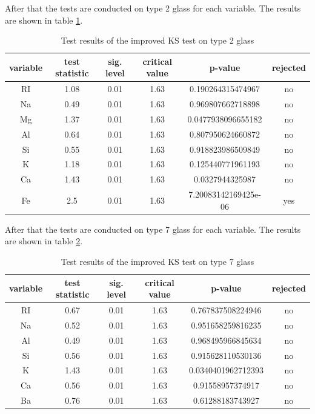 \documentclass[a4paper, 12pt, titlepage, headsepline, listof = totoc, bibliography = totoc, numbers = noenddot]{scrartcl}
\begin{document}
After that the tests are conducted on type 2 glass for each variable.
The results are shown in table \ref{tab:KS-type2}.

\begin{table}[h!]
\centering
\begin{tabular}{|cccccc|} \hline variable & test statistic & sig. level & critical value & p-value & rejected\\ \hline RI & 1.08 & 0.01 & 1.63 & 0.190264315474967 & no\\ 
Na & 0.49 & 0.01 & 1.63 & 0.969807662718898 & no\\ 
Mg & 1.37 & 0.01 & 1.63 & 0.0477938096655182 & no\\ 
Al & 0.64 & 0.01 & 1.63 & 0.807950624660872 & no\\ 
Si & 0.55 & 0.01 & 1.63 & 0.918823986509849 & no\\ 
K & 1.18 & 0.01 & 1.63 & 0.125440771961193 & no\\ 
Ca & 1.43 & 0.01 & 1.63 & 0.0327944325987 & no\\ 
Fe & 2.5 & 0.01 & 1.63 & 7.20083142169425e-06 & yes\\ \hline \end{tabular}\caption{Test results of the improved KS test on type 2 glass}
\label{tab:KS-type2}
\end{table}

After that the tests are conducted on type 7 glass for each variable.
The results are shown in table \ref{tab:KS-type7}.

\begin{table}[h!]
\centering
\begin{tabular}{|cccccc|} \hline variable & test statistic & sig. level & critical value & p-value & rejected\\ \hline RI & 0.67 & 0.01 & 1.63 & 0.767837508224946 & no\\ 
Na & 0.52 & 0.01 & 1.63 & 0.951658259816235 & no\\ 
Al & 0.49 & 0.01 & 1.63 & 0.968495966845634 & no\\ 
Si & 0.56 & 0.01 & 1.63 & 0.915628110530136 & no\\ 
K & 1.43 & 0.01 & 1.63 & 0.0340401962712393 & no\\ 
Ca & 0.56 & 0.01 & 1.63 & 0.91558957374917 & no\\ 
Ba & 0.76 & 0.01 & 1.63 & 0.61288183743927 & no\\ \hline \end{tabular}\caption{Test results of the improved KS test on type 7 glass}
\label{tab:KS-type7}
\end{table}
\end{document}
